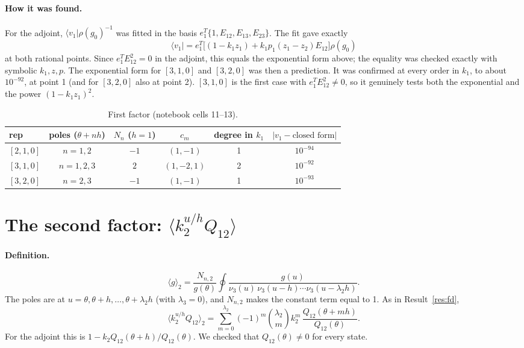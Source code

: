 \documentclass[11pt]{article}
\theoremstyle{definition}
\theoremstyle{remark}
\begin{document}
\paragraph{How it was found.}
For the adjoint, $\langle v_1|\rho(g_0)^{-1}$ was fitted in the basis $e_1^T\{1,E_{12},E_{13},E_{23}\}$. The fit gave exactly
\begin{equation}
\langle v_1|=e_1^T\big[(1-k_1z_1)+k_1p_1(z_1-z_2)E_{12}\big]\rho(g_0)
\end{equation}
at both rational points. Since $e_1^TE_{12}^2=0$ in the adjoint, this equals the exponential form above; the equality was checked exactly with symbolic $k_1,z,p$. The exponential form for $[3,1,0]$ and $[3,2,0]$ was then a prediction. It was confirmed at every order in $k_1$, to about $10^{-92}$, at point 1 (and for $[3,2,0]$ also at point 2). $[3,1,0]$ is the first case with $e_1^TE_{12}^2\neq0$, so it genuinely tests both the exponential and the power $(1-k_1z_1)^2$.

\begin{table}[h]\centering
\begin{tabular}{lccccc}\toprule
rep & poles ($\theta+nh$) & $N_n$ ($h=1$) & $c_m$ & degree in $k_1$ & $|v_1-\text{closed form}|$\\\midrule
$[2,1,0]$ & $n=1,2$ & $-1$ & $(1,-1)$ & 1 & $10^{-94}$\\
$[3,1,0]$ & $n=1,2,3$ & $2$ & $(1,-2,1)$ & 2 & $10^{-92}$\\
$[3,2,0]$ & $n=2,3$ & $-1$ & $(1,-1)$ & 1 & $10^{-93}$\\\bottomrule
\end{tabular}
\caption{First factor (notebook cells 11--13).}
\end{table}

\section{The second factor: $\langle k_2^{u/h}Q_{12}\rangle$}\label{sec:second}

\paragraph{Definition.}
\begin{equation}
\langle g\rangle_2=\frac{N_{n,2}}{g(\theta)}\oint\frac{g(u)}{\nu_3(u)\,\nu_3(u-h)\cdots\nu_3(u-\lambda_2h)} .
\end{equation}
The poles are at $u=\theta,\theta+h,\dots,\theta+\lambda_2h$ (with $\lambda_3=0$), and $N_{n,2}$ makes the constant term equal to 1. As in Result~\ref{res:fd},
\begin{equation}
\langle k_2^{u/h}Q_{12}\rangle_2=\sum_{m=0}^{\lambda_2}(-1)^m\binom{\lambda_2}{m}k_2^m\,\frac{Q_{12}(\theta+mh)}{Q_{12}(\theta)} .
\end{equation}
For the adjoint this is $1-k_2Q_{12}(\theta+h)/Q_{12}(\theta)$. We checked that $Q_{12}(\theta)\neq0$ for every state.
\end{document}
